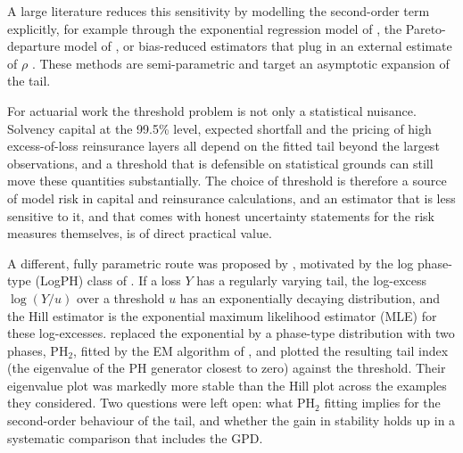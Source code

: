 \documentclass[12pt]{article}
\theoremstyle{definition}
\theoremstyle{remark}
\begin{document}
A large literature reduces this sensitivity by modelling the second-order term explicitly, for example through the exponential regression model of \citet{Beirlant1999}, the Pareto-departure model of \citet{FeuervergerHall1999}, or bias-reduced estimators that plug in an external estimate of $\rho$ \citep{FragaAlves2003,GomesGuillou2015}. These methods are semi-parametric and target an asymptotic expansion of the tail.

For actuarial work the threshold problem is not only a statistical nuisance. Solvency capital at the 99.5\% level, expected shortfall and the pricing of high excess-of-loss reinsurance layers all depend on the fitted tail beyond the largest observations, and a threshold that is defensible on statistical grounds can still move these quantities substantially. The choice of threshold is therefore a source of model risk in capital and reinsurance calculations, and an estimator that is less sensitive to it, and that comes with honest uncertainty statements for the risk measures themselves, is of direct practical value.

A different, fully parametric route was proposed by \citet{KimKim2015}, motivated by the log phase-type (LogPH) class of \citet{Ahn2012}. If a loss $Y$ has a regularly varying tail, the log-excess $\log(Y/u)$ over a threshold $u$ has an exponentially decaying distribution, and the Hill estimator is the exponential maximum likelihood estimator (MLE) for these log-excesses. \citet{KimKim2015} replaced the exponential by a phase-type distribution with two phases, PH$_2$, fitted by the EM algorithm of \citet{Asmussen1996}, and plotted the resulting tail index (the eigenvalue of the PH generator closest to zero) against the threshold. Their eigenvalue plot was markedly more stable than the Hill plot across the examples they considered. Two questions were left open: what PH$_2$ fitting implies for the second-order behaviour of the tail, and whether the gain in stability holds up in a systematic comparison that includes the GPD.
\end{document}
